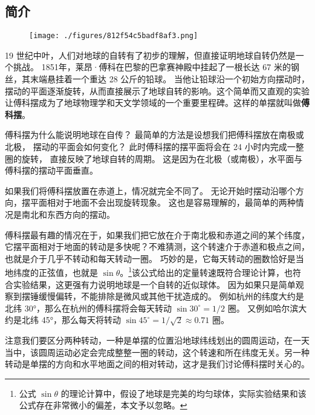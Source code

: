 
\begin{issues}
\end{issues}

\subsection{简介}

\begin{figure}[ht]
\centering
\texttt{[image: ./figures/812f54c5badf8af3.png]}
\caption{} \label{fig_FouPen_1}
\end{figure}

19 世纪中叶，人们对地球的自转有了初步的理解，但直接证明地球自转仍然是一个挑战。 1851年，莱昂·傅科在巴黎的巴拿赛神殿中挂起了一根长达 67 米的钢丝，其末端悬挂着一个重达 28 公斤的铅球。 当他让铅球沿一个初始方向摆动时，摆动的平面逐渐旋转，从而直接展示了地球自转的影响。这个简单而又直观的实验让傅科摆成为了地球物理学和天文学领域的一个重要里程碑。这样的单摆就叫做\textbf{傅科摆}。

傅科摆为什么能说明地球在自传？ 最简单的方法是设想我们把傅科摆放在南极或北极， 摆动的平面会如何变化？ 此时傅科摆的摆平面将会在 24 小时内完成一整圈的旋转， 直接反映了地球自转的周期。 这是因为在北极（或南极），水平面与傅科摆的摆动平面垂直。

如果我们将傅科摆放置在赤道上，情况就完全不同了。 无论开始时摆动沿哪个方向，摆平面相对于地面不会出现旋转现象。 这也是容易理解的，最简单的两种情况是南北和东西方向的摆动。

傅科摆最有趣的情况在于，如果我们把它放在介于南北极和赤道之间的某个纬度，它摆平面相对于地面的转动是多快呢？不难猜测，这个转速介于赤道和极点之间，也就是介于几乎不转动和每天转动一圈。 巧妙的是，它每天转动的圈数恰好是当地纬度的正弦值，也就是 $\sin\theta$。\footnote{公式 $\sin\theta$ 的理论计算中，假设了地球是完美的均匀球体，实际实验结果和该公式存在非常微小的偏差，本文予以忽略。}该公式给出的定量转速既符合理论计算，也符合实验结果，这更强有力说明地球是一个自转的近似球体。 因为如果只是简单观察到摆锤缓慢偏转，不能排除是微风或其他干扰造成的。 例如杭州的纬度大约是北纬 30°，那么在杭州的傅科摆将会每天转动 $\sin 30^\circ = 1/2$ 圈。 又例如哈尔滨大约是北纬 45°，那么每天将转动 $\sin 45^\circ = 1/\sqrt{2}\approx 0.71$ 圈。

注意我们要区分两种转动，一种是单摆的位置沿地球纬线划出的圆周运动，在一天当中，该圆周运动必定会完成整整一圈的转动，这个转速和所在纬度无关。另一种转动是单摆的方向和水平地面之间的相对转动，这才是我们讨论傅科摆时关心的。

